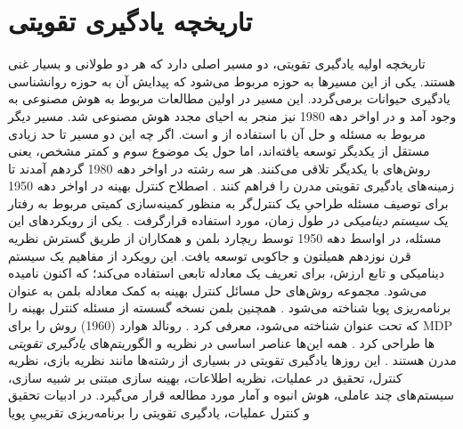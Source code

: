 \section{تاریخچه یادگیری تقویتی}
تاریخچه اولیه یادگیری تقویتی، دو مسیر اصلی دارد که هر دو طولانی و بسیار غنی هستند. یکی از این مسیرها به حوزه  مربوط می‌شود که پیدایش آن به حوزه روانشناسی یادگیری حیوانات برمی‌گردد. این مسیر در اولین مطالعات مربوط به هوش مصنوعی به وجود آمد و در اواخر دهه 1980 نیز منجر به احیای مجدد هوش مصنوعی شد. مسیر دیگر مربوط به مسئله 
\textit{}
و حل آن با استفاده از
\textit{
}
  و
\textit{}
    است. اگر چه این دو مسیر تا حد زیادی مستقل از یکدیگر توسعه یافته‌اند، اما حول یک موضوع سوم و کمتر مشخص، یعنی روش‌های 
\textit{}
  با یکدیگر تلاقی می‌کنند. هر سه رشته در اواخر دهه 1980 گرد‌هم آمدند تا زمینه‌های یادگیری تقویتی مدرن را فراهم کنند
 \cite{suttonbook}.
اصطلاح کنترل بهینه
در اواخر دهه 1950
برای توصیف مسئله طراحیِ یک کنترل‌گر به منظور کمینه‌سازی کمیتی مربوط به رفتار یک \textit{سیستم دینامیکی} در طول زمان، مورد استفاده قرارگرفت
\cite{mldef}.
 یکی از رویکردهای این مسئله، در اواسط دهه 1950 توسط ریچارد بلمن و همکاران از طریق گسترش نظریه قرن نوزدهم همیلتون و جاکوبی
 توسعه یافت. این رویکرد از مفاهیم 
\textit{}
 یک سیستم دینامیکی و تابع ارزش، برای تعریف یک معادله تابعی استفاده می‌کند؛ که اکنون 
 \textit{
 }
  نامیده می‌شود. مجموعه روش‌های حل مسائل کنترل بهینه به کمک معادله بلمن به عنوان برنامه‌ریزی پویا شناخته می‌شود
  \cite{bellman1957dynamic}.
   همچنین بلمن نسخه گسسته از مسئله کنترل بهینه را که تحت عنوان 
  \textit{
  } 
شناخته می‌شود، معرفی کرد
\cite{bellman1957markovian}.
 رونالد هوارد (1960) روش 
\textit{
}
را برای MDP‌‌ ها طراحی کرد
\cite{howard1960dynamic}. 
همه این‌ها عناصر اساسی در نظریه و الگوریتم‌های \textit{یادگیری تقویتی} مدرن هستند
\cite{suttonbook}.
این روزها یادگیری تقویتی
در بسیاری از رشته‌ها مانند نظریه بازی، نظریه کنترل، تحقیق در عملیات، نظریه اطلاعات، بهینه سازی مبتنی بر شبیه سازی، سیستم‌های چند عاملی، هوش انبوه و آمار مورد مطالعه قرار می‌گیرد. در ادبیات تحقیق و کنترل عملیات، یادگیری تقویتی را برنامه‌ریزی تقریبیِ پویا

